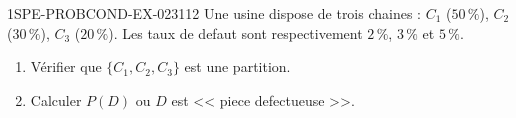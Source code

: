 \begin{exercice}{1SPE-PROBCOND-EX-023}{1}{12}
Une usine dispose de trois chaines : $C_1$ ($50\,\%$), $C_2$ ($30\,\%$), $C_3$ ($20\,\%$). Les taux de defaut sont respectivement $2\,\%$, $3\,\%$ et $5\,\%$.

\begin{enumerate}
  \item Vérifier que $\{C_1, C_2, C_3\}$ est une partition.
  \item Calculer $P(D)$ ou $D$ est << piece defectueuse >>.
\end{enumerate}
\end{exercice}
